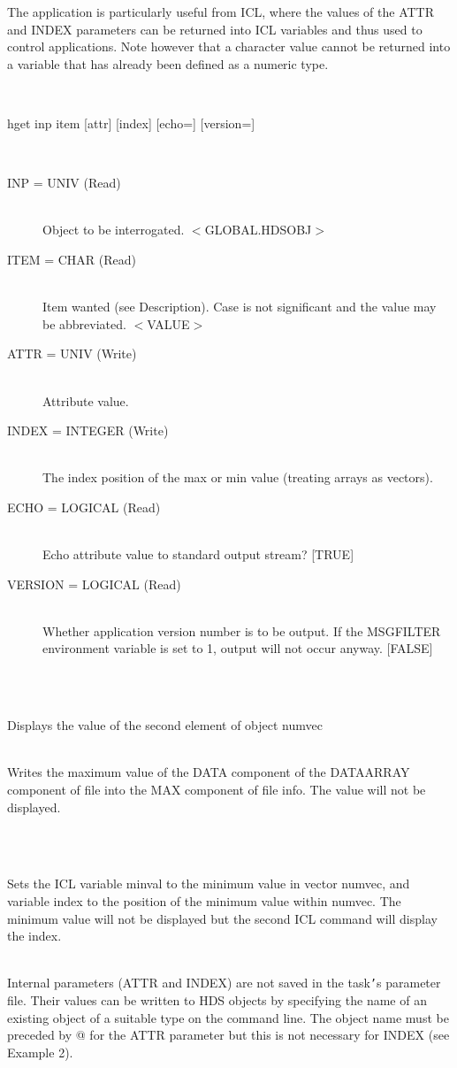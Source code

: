 \documentclass[twoside,11pt]{article}
\renewcommand{\_}{\texttt{\symbol{95}}}
\newlength{\sstexampleslength}
\newcommand{\sstusage}[1]{\item[Usage:] \mbox{}
\\[1.3ex]{\raggedright \ssttt #1}}
\newcommand{\sstparameters}[1]{
   \item[Parameters:] \mbox{} \\
   \vspace{-3.5ex}
   \begin{description}
      #1
   \end{description}
}
\newcommand{\sstexamples}[1]{
   \item[Examples:] \mbox{} \\
   \vspace{-3.5ex}
   \begin{description}
      #1
   \end{description}
}
\newcommand{\sstsubsection}[1]{ \item[{#1}] \mbox{} \\}
\newcommand{\sstexamplesubsection}[2]{\sloppy
\item[\parbox{\sstexampleslength}{\ssttt #1}] \mbox{} \vspace{1.0ex}
\\ #2 }
\newcommand{\sstnotes}[1]{\item[Notes:] \mbox{} \\[1.3ex] #1}
\newcommand{\sstusage}[1]{\item[Usage:]
      \begin{description}
         {\ssttt #1}
      \end{description}
      \\
   }
\newcommand{\sstparameters}[1]{
      \item[Parameters:] \\
      \begin{description}
         #1
      \end{description}
      \\
   }
\newcommand{\sstexamples}[1]{
      \item[Examples:] \\
      \begin{description}
         #1
      \end{description}
      \\
   }
\newcommand{\sstsubsection}[1]{\item[{#1}]}
\newcommand{\sstexamplesubsection}[2]{\item[{\ssttt #1}] #2}
\newcommand{\sstnotes}[1]{\item[Notes:] #1 }
\begin{document}
{{      The application is particularly useful from ICL, where the values of
      the ATTR and INDEX parameters can be returned into ICL variables and
      thus used to control applications. Note however that a character value
      cannot be returned into a variable that has already been defined as
      a numeric type.
   }
   \sstusage{
      hget inp item [attr] [index] [echo=] [version=]
   }
   \sstparameters{
      \sstsubsection{
         INP = UNIV (Read)
      }{
         Object to be interrogated. $<$GLOBAL.HDSOBJ$>$
      }
      \sstsubsection{
         ITEM = \_CHAR (Read)
      }{
         Item wanted (see Description). Case is not significant and the
         value may be abbreviated. $<$VALUE$>$
      }
      \sstsubsection{
         ATTR = UNIV (Write)
      }{
         Attribute value.
      }
      \sstsubsection{
         INDEX = \_INTEGER (Write)
      }{
         The index position of the max or min value (treating arrays as
         vectors).
      }
      \sstsubsection{
         ECHO = \_LOGICAL (Read)
      }{
         Echo attribute value to standard output stream? [TRUE]
      }
      \sstsubsection{
         VERSION = \_LOGICAL (Read)
      }{
         Whether application version number is to be output. If the MSG\_FILTER
         environment variable is set to 1, output will not occur anyway.
         [FALSE]
      }
   }
   \sstexamples{
      \sstexamplesubsection{
         \% hget {\tt '}numvec(2){\tt '} value
      }{
         Displays the value of the second element of object numvec
      }
      \sstexamplesubsection{
         \% hget file.data\_array.data max attr=@info.max noecho
      }{
         Writes the maximum value of the DATA component of the DATA\_ARRAY
         component of file into the MAX component of file info. The value
         will not be displayed.
      }
      \sstexamplesubsection{
         ICL$>$ hget numvec min (minval) (index) echo=f
      }{
      }
      \sstexamplesubsection{
         ICL$>$ =index
      }{
         Sets the ICL variable minval to the minimum value in vector numvec,
         and variable index to the position of the minimum value within
         numvec. The minimum value will not be displayed but the second
         ICL command will display the index.
      }
   }
   \sstnotes{
      Internal parameters (ATTR and INDEX) are not saved in the task{\tt '}s
      parameter file. Their values can be written to HDS objects by
      specifying the name of an existing object of a suitable type on the
      command line. The object name must be preceded by @ for the ATTR
      parameter but this is not necessary for INDEX (see Example 2).
   }
}
\end{document}
